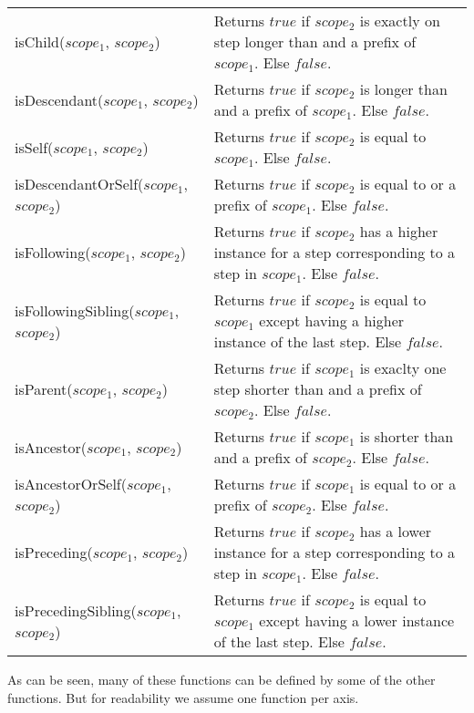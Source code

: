 \begin{center}
\begin{tabular}{l|p{9cm}}
\textsf{isChild(}$scope_1$\textsf{, }$scope_2$\textsf{)} 
& Returns $true$ if $scope_2$ is exactly on step longer than and a prefix of $scope_1$. Else $false$. 
\\ \textsf{isDescendant(}$scope_1$\textsf{, }$scope_2$\textsf{)} 
& Returns $true$ if $scope_2$ is longer than and a prefix of $scope_1$. Else $false$. 
\\ \textsf{isSelf(}$scope_1$\textsf{, }$scope_2$\textsf{)} 
& Returns $true$ if $scope_2$ is equal to $scope_1$. Else $false$.
\\ \textsf{isDescendantOrSelf(}$scope_1$\textsf{, }$scope_2$\textsf{)} 
& Returns $true$ if $scope_2$ is equal to or a prefix of $scope_1$. Else $false$.
\\ \textsf{isFollowing(}$scope_1$\textsf{, }$scope_2$\textsf{)} 
& Returns $true$ if $scope_2$ has a higher instance for a step corresponding to a step in $scope_1$. Else $false$. 
\\
\textsf{isFollowingSibling(}$scope_1$\textsf{, }$scope_2$\textsf{)} 
& Returns $true$ if $scope_2$ is equal to $scope_1$ except having a higher instance of the last step. Else $false$.
\\
\textsf{isParent(}$scope_1$\textsf{, }$scope_2$\textsf{)} 
& Returns $true$ if $scope_1$ is exaclty one step shorter than and a prefix of $scope_2$. Else $false$. \\
\textsf{isAncestor(}$scope_1$\textsf{, }$scope_2$\textsf{)} 
& Returns $true$ if $scope_1$ is shorter than and a prefix of $scope_2$. Else $false$.\\
\textsf{isAncestorOrSelf(}$scope_1$\textsf{, }$scope_2$\textsf{)} 
& Returns $true$ if $scope_1$ is equal to or a prefix of $scope_2$. Else $false$. \\
\textsf{isPreceding(}$scope_1$\textsf{, }$scope_2$\textsf{)} 
& Returns $true$ if $scope_2$ has a lower instance for a step corresponding to a step in $scope_1$. Else $false$. 
\\
\textsf{isPrecedingSibling(}$scope_1$\textsf{, }$scope_2$\textsf{)} 
& Returns $true$ if $scope_2$ is equal to $scope_1$ except having a lower instance of the last step. Else
$false$.
\end{tabular}
\end{center}

As can be seen, many of these functions can be defined by some of the other functions. But for readability we
assume one function per axis.

